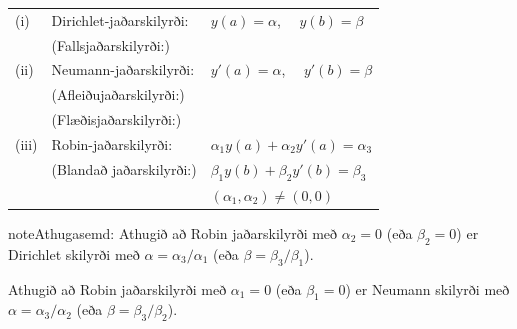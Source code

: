 \documentclass[letterpaper,10pt,icelandic]{sphinxmanual}
\begin{document}
\begin{tabular}{lll}
	(i)  &Dirichlet-jaðarskilyrði: &  $y(a)=\alpha$, \ \  $y(b)=\beta$\\
	&(Fallsjaðarskilyrði:) \\ 
	(ii)&Neumann-jaðarskilyrði: 
	& $y'(a)=\alpha$, \ \  $y'(b)=\beta$\\
	&(Afleiðujaðarskilyrði:)\\
	&(Flæðisjaðarskilyrði:)\\
	(iii)&Robin-jaðarskilyrði: 
	&$\alpha_1y(a)+\alpha_2 y'(a)=\alpha_3$ \\ 
	&(Blandað jaðarskilyrði:)&$\beta_1 y(b)+\beta_2y'(b)=\beta_3$\\
	&&$(\alpha_1,\alpha_2)\neq (0,0)$
\end{tabular}
%
%
%
%
%
%
%


\begin{notice}{note}{Athugasemd:}
Athugið að Robin jaðarskilyrði með \(\alpha_2=0\) (eða
\(\beta_2=0\)) er Dirichlet skilyrði með \(\alpha=\alpha_3/\alpha_1\) (eða
\(\beta=\beta_3/\beta_1\)).

Athugið að Robin jaðarskilyrði með \(\alpha_1=0\) (eða
\(\beta_1=0\))
er Neumann skilyrði með \(\alpha=\alpha_3/\alpha_2\) (eða
\(\beta=\beta_3/\beta_2\)).
\end{notice}
\end{document}
